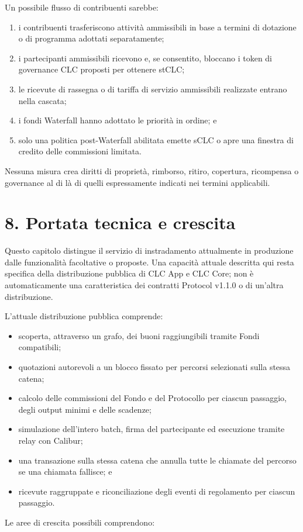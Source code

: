 \documentclass[11pt]{article}
\begin{document}
Un possibile flusso di contribuenti sarebbe:

\begin{enumerate}[leftmargin=*]
\item i contribuenti trasferiscono attività ammissibili in base a termini di dotazione o di programma adottati separatamente;
\item i partecipanti ammissibili ricevono e, se consentito, bloccano i token di governance CLC proposti per ottenere stCLC;
\item le ricevute di rassegna o di tariffa di servizio ammissibili realizzate entrano nella cascata;
\item i fondi Waterfall hanno adottato le priorità in ordine; e
\item solo una politica post-Waterfall abilitata emette sCLC o apre una finestra di credito delle commissioni limitata.
\end{enumerate}
Nessuna misura crea diritti di proprietà, rimborso, ritiro, copertura, ricompensa o governance al di là di quelli espressamente indicati nei termini applicabili.


\section*{8. Portata tecnica e crescita}

Questo capitolo distingue il servizio di instradamento attualmente in produzione dalle funzionalità facoltative o proposte. Una capacità attuale descritta qui resta specifica della distribuzione pubblica di CLC App e CLC Core; non è automaticamente una caratteristica dei contratti Protocol v1.1.0 o di un'altra distribuzione.

L'attuale distribuzione pubblica comprende:

\begin{itemize}[leftmargin=*]
\item scoperta, attraverso un grafo, dei buoni raggiungibili tramite Fondi compatibili;
\item quotazioni autorevoli a un blocco fissato per percorsi selezionati sulla stessa catena;
\item calcolo delle commissioni del Fondo e del Protocollo per ciascun passaggio, degli output minimi e delle scadenze;
\item simulazione dell'intero batch, firma del partecipante ed esecuzione tramite relay con Calibur;
\item una transazione sulla stessa catena che annulla tutte le chiamate del percorso se una chiamata fallisce; e
\item ricevute raggruppate e riconciliazione degli eventi di regolamento per ciascun passaggio.
\end{itemize}
Le aree di crescita possibili comprendono:
\end{document}
